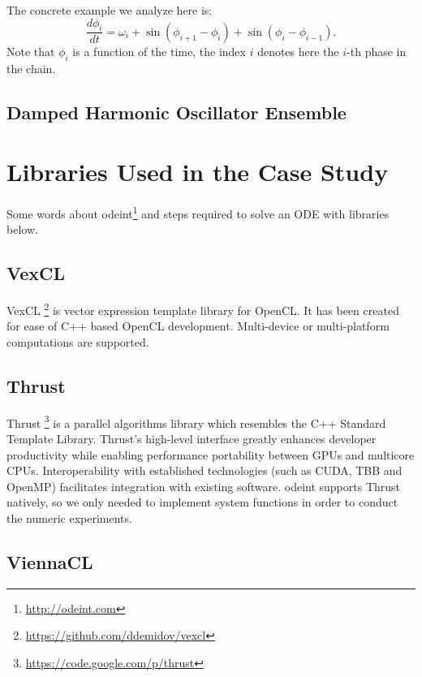 \documentclass[1p]{elsarticle}
\begin{document}
The concrete example we analyze here is:
\begin{equation}
    \frac{d\phi_i}{dt} = \omega_i + \sin( \phi_{i+1} - \phi_i) + \sin( \phi_i
    - \phi_{i-1}).
\end{equation}
Note that $\phi_i$ is a function of the time, the index $i$ denotes here the
$i$-th phase in the chain.

\subsection{Damped Harmonic Oscillator Ensemble}

\section{Libraries Used in the Case Study}

Some words about odeint\footnote{\href{http://odeint.com}{http://odeint.com}}
and steps required to solve an ODE with libraries below.

\subsection{VexCL}

VexCL%
\footnote{\href{https://github.com/ddemidov/vexcl}{https://github.com/ddemidov/vexcl}}
is vector expression template library for OpenCL. It has been created for
ease of C++ based OpenCL development. Multi-device or multi-platform
computations are supported.

\subsection{Thrust}

Thrust%
\footnote{\href{https://code.google.com/p/thrust}{https://code.google.com/p/thrust}}
is a parallel algorithms library which resembles the C++ Standard Template
Library. Thrust's high-level interface greatly enhances developer
productivity while enabling performance portability between GPUs and multicore
CPUs. Interoperability with established technologies (such as CUDA, TBB and
OpenMP) facilitates integration with existing software. odeint supports Thrust
natively, so we only needed to implement system functions in order to conduct
the numeric experiments.

\subsection{ViennaCL}
\end{document}
